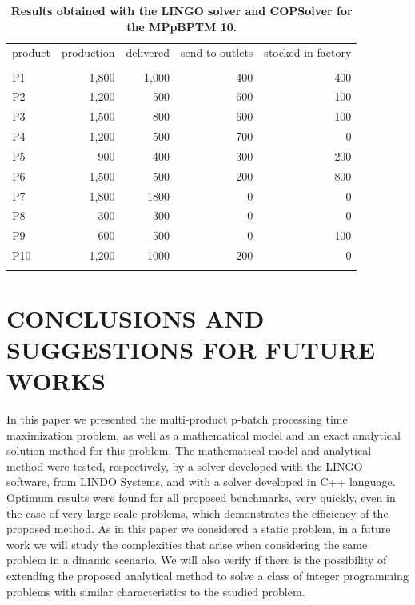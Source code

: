 \documentclass[10pt,fleqn,a4paper,twoside]{article}
\begin{document}
\begin{table}[h!]
\begin{center}
\caption{\textbf{Results obtained with the LINGO solver and COPSolver for the MPpBPTM 10.}}
\begin{footnotesize}
\begin{tabular}[c]{l r r r r}
\\
product & production & delivered & send to outlets & stocked in factory \\
\cline {1-5} \\
P1 & 1,800 & 1,000 & 400 & 400 \\
P2 & 1,200 & 500 & 600 & 100 \\
P3 & 1,500 & 800 & 600 & 100 \\
P4 & 1,200 & 500 & 700 & 0 \\
P5 & 900 & 400 & 300 & 200 \\
P6 & 1,500 & 500 & 200 & 800 \\
P7 & 1,800 & 1800 & 0 & 0 \\
P8 & 300 & 300 & 0 & 0 \\
P9 & 600 & 500 & 0 & 100 \\
P10 & 1,200 & 1000 & 200 & 0 \\
\cline {1-5} \\
\end{tabular}
\label{tab:compResultsMBPTMP3}
\end{footnotesize}
\end{center}
\end{table}

\section{CONCLUSIONS AND SUGGESTIONS FOR FUTURE WORKS}
\label{sec:conclusions}

In this paper we presented the multi-product p-batch processing time maximization problem, as well as a mathematical model and an exact analytical solution method for this problem. The mathematical model and analytical method were tested, respectively, by a solver developed with the LINGO software, from LINDO Systems, and with a solver developed in C++ language. Optimum results were found for all proposed benchmarks, very quickly, even in the case of very large-scale problems, which demonstrates the efficiency of the proposed method. As in this paper we considered a static problem, in a future work we will study the complexities that arise when considering the same problem in a dinamic scenario. We will also verify if there is the possibility of extending the proposed analytical method to solve a class of integer programming problems with similar characteristics to the studied problem.
\end{document}
